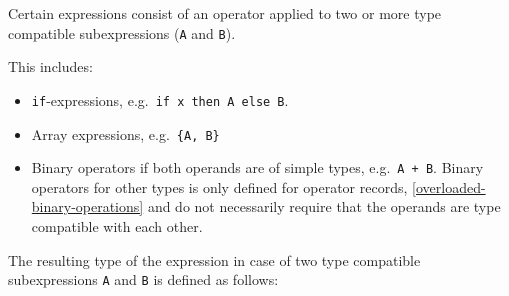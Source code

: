 Certain expressions consist of an operator applied to two or more type compatible subexpressions (\lstinline!A! and \lstinline!B!).

This includes:
\begin{itemize}
\item \lstinline!if!-expressions, e.g.\ \lstinline!if x then A else B!.
\item Array expressions, e.g.\ \lstinline!{A, B}!
\item Binary operators if both operands are of simple types, e.g.\ \lstinline!A + B!.
Binary operators for other types is only defined for operator records, \cref{overloaded-binary-operations} and do not necessarily require that the operands are type compatible with each other.
\end{itemize}
The resulting type of the expression in case of two type compatible subexpressions \lstinline!A! and \lstinline!B! is defined as follows:
